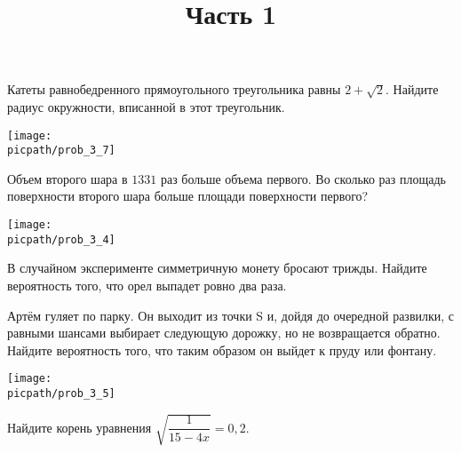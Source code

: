 \begin{training}[2]
	\title{Часть 1}
	\egepreambone
	\begin{listofex}
		\item
		\begin{minipage}[t]{\bodywidth}
			Катеты равнобедренного прямоугольного треугольника равны \( 2+\sqrt{2} \). Найдите радиус окружности, вписанной в этот треугольник.
			\foranswer
		\end{minipage}
		\gapwidth
		\begin{minipage}[t]{\picwidth}
			\texttt{[image: \\picpath/prob\_3\_7]}
		\end{minipage}
		\item
		\begin{minipage}[t]{\bodywidth}
			Объем второго шара в \( 1331 \) раз больше объема первого. Во сколько раз площадь поверхности второго шара больше площади поверхности первого?
			\foranswer
		\end{minipage}
		\gapwidth
		\begin{minipage}[t]{\picwidth}
			\texttt{[image: \\picpath/prob\_3\_4]}
		\end{minipage}
		\item В случайном эксперименте симметричную монету бросают трижды. Найдите вероятность того, что орел выпадет ровно два раза.
		\foranswer
		\item 
			Артём гуляет по парку. Он выходит из точки S и, дойдя до очередной развилки, с равными шансами выбирает следующую дорожку, но не возвращается обратно. Найдите вероятность того, что таким образом он выйдет к пруду или фонтану.
			\foranswer
		\begin{center}
			\texttt{[image: \\picpath/prob\_3\_5]}
		\end{center}
		\item Найдите корень уравнения \( \sqrt{\dfrac{1}{15-4x}}=0,2 \). 
		\foranswer
		

\end{listofex}
\end{training}
